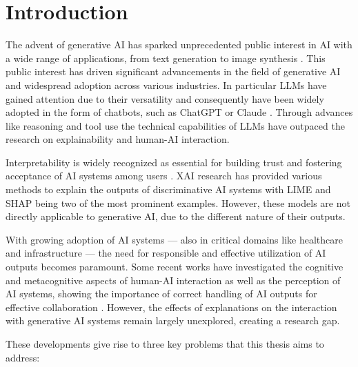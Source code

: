 \section{Introduction} \label{sec:introduction}

The advent of generative \ac{AI} has sparked unprecedented public interest in \ac{AI} with a wide range of applications, from text generation \parencite{OpenAI2022} to image synthesis \parencite{Rombach2021}. This public interest has driven significant advancements in the field of generative \ac{AI} and widespread adoption across various industries. In particular \acp{LLM} have gained attention due to their versatility and consequently have been widely adopted in the form of chatbots, such as ChatGPT \parencite{OpenAI2025} or Claude \parencite{AnthropicInc2025}. Through advances like reasoning \parencite{OpenAI2024a} and tool use \parencite{AnthropicInc2024} the technical capabilities of \acp{LLM} have outpaced the research on explainability and human-\ac{AI} interaction.

Interpretability is widely recognized as essential for building trust and fostering acceptance of \ac{AI} systems among users \parencite{Arrieta2020,Shin2021}. \ac{XAI} research has provided various methods to explain the outputs of discriminative \ac{AI} systems with LIME \parencite{Ribeiro2016} and SHAP \parencite{Lundberg2017} being two of the most prominent examples. However, these models are not directly applicable to generative \ac{AI}, due to the different nature of their outputs.

With growing adoption of \ac{AI} systems — also in critical domains like healthcare and infrastructure — the need for responsible and effective utilization of \ac{AI} outputs becomes paramount. Some recent works have investigated the cognitive and metacognitive aspects of human-\ac{AI} interaction as well as the perception of \ac{AI} systems, showing the importance of correct handling of \ac{AI} outputs for effective collaboration \parencite{Jussupow2021,Kazemitabaar2024}. However, the effects of explanations on the interaction with generative \ac{AI} systems remain largely unexplored, creating a research gap.

These developments give rise to three key problems that this thesis aims to address:



